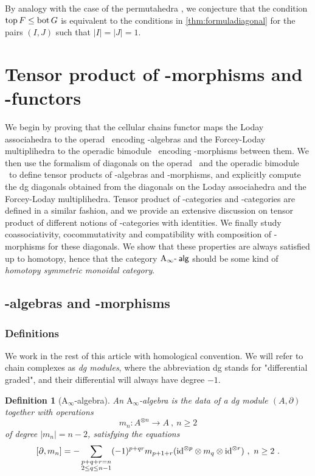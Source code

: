 \documentclass[twoside, 12pt]{amsart}
\newtheorem{definition}{Definition}[section]
\theoremstyle{remark}
\begin{document}
By analogy with the case of the permutahedra \cite[Proposition 3.17]{LA21}, we conjecture that the condition $\operatorname{top} F\leq \operatorname{bot} G$ is equivalent to the conditions in \cref{thm:formuladiagonal} for the pairs $(I,J)$ such that $|I|=|J|=1$. 


\section{Tensor product of \Ainf -morphisms and \Ainf -functors}
\label{sec:IV}

We begin by proving that the cellular chains functor maps the Loday associahedra to the operad \Ainf\ encoding \Ainf -algebras and the Forcey-Loday multiplihedra to the operadic bimodule \Minf\ encoding \Ainf -morphisms between them.
We then use the formalism of diagonals on the operad \Ainf\ and the operadic bimodule \Minf\ to define tensor products of \Ainf -algebras and \Ainf -morphisms, and explicitly compute the dg diagonals obtained from the diagonals on the Loday associahedra and the Forcey-Loday multiplihedra.
Tensor product of \Ainf -categories and \Ainf -categories are defined in a similar fashion, and we provide an extensive discussion on tensor product of different notions of \Ainf -categories with identities.
We finally study coassociativity, cocommutativity and compatibility with composition of \Ainf -morphisms for these diagonals. We show that these properties are always satisfied up to homotopy, hence that the category $\mathrm{A}_\infty\text{-\hspace{2pt}}\mathsf{alg}$ should be some kind of \textit{homotopy symmetric monoidal category}.

\subsection{\Ainf -algebras and \Ainf -morphisms} \label{ss:ainf-alg-ainf-morph}

\subsubsection{Definitions}

We work in the rest of this article with homological convention. 
We will refer to chain complexes as \emph{dg modules}, where the abbreviation dg stands for "differential graded", and their differential will always have degree $-1$.

\begin{definition}[$\mathrm{A}_\infty$-algebra] \label{def:ainf-alg} An \emph{$\mathrm{A}_\infty$-algebra} is the data of a dg module $(A,\partial)$ together with operations \[ m_n : A^{\otimes n} \to A \ , \ n \geq 2 \] of degree $|m_n|=n-2$, satisfying the equations 
\[ [ \partial , m_n ] = - \sum_{\substack{p+q+r=n \\ 2 \leq q \leq n-1}} (-1)^{p+qr}m_{p+1+r}(\mathrm{id}^{\otimes p} \otimes m_q \otimes \mathrm{id}^{\otimes r}) \ , \ n\geq 2 \ . \]
\end{definition}
\end{document}
